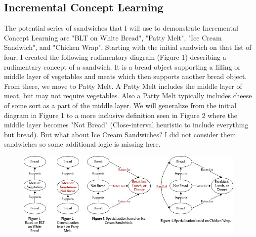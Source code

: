 \documentclass[
	letterpaper, %
]{jdf}
\begin{document}
\subsection{Incremental Concept Learning}
The potential series of sandwiches that I will use to demonstrate Incremental Concept Learning are "BLT on White Bread", "Patty Melt", "Ice Cream Sandwich", and "Chicken Wrap". Starting with the initial sandwich on that list of four, I created the following rudimentary diagram (Figure 1) describing a rudimentary concept of a sandwich. It is a bread object supporting a filling or middle layer of vegetables and meats which then supports another bread object. From there, we move to Patty Melt. A Patty Melt includes the middle layer of meat, but may not require vegetables. Also a Patty Melt typically includes cheese of some sort as a part of the middle layer. We will generalize from the initial diagram in Figure 1 to a more inclusive definition seen in Figure 2 where the middle layer becomes "Not Bread" (Close-interval heuristic to include everything but bread). But what about Ice Cream Sandwiches? I did not consider them sandwiches so some additional logic is missing here. 

\begin{figure}[h]
	\centering
	\includegraphics{SandwichFiguresCorrection.jpg}
	\label{fig:flowchart}
\end{figure}
\end{document}
